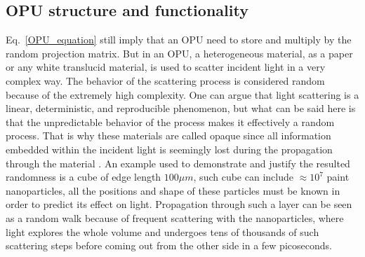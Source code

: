 \subsection{OPU structure and functionality}
Eq.~\ref{OPU_equation} still imply that an OPU need to store and multiply by the random projection matrix. But in an OPU, a heterogeneous material, as a paper or any white translucid material, is used to scatter incident light in a very complex way. The behavior of the scattering process is considered random because of the extremely high complexity. One can argue that light scattering is a linear, deterministic, and reproducible phenomenon, but what can be said here is that the unpredictable behavior of the process makes it effectively a random process. That is why these materials are called opaque since all information embedded within the incident light is seemingly lost during the propagation through the material \citep{saade_opu}. An example used to demonstrate and justify the resulted randomness is a cube of edge length $100\mu m$, such cube can include $\approx 10^7$ paint nanoparticles, all the positions and shape of these particles must be known in order to predict its effect on light. Propagation through such a layer can be seen as a random walk because of frequent scattering with the nanoparticles, where light explores the whole volume and undergoes tens of thousands of such scattering steps before coming out from the other side in a few picoseconds.\newline

